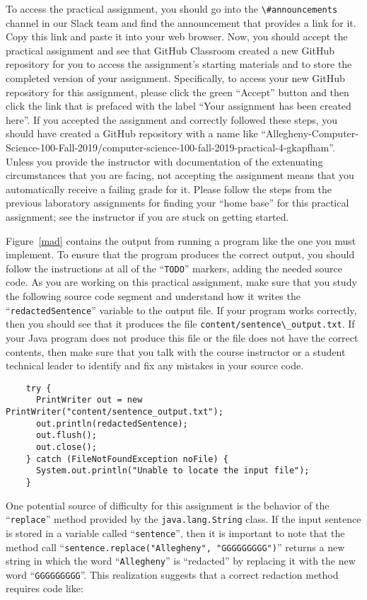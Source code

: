\documentclass[11pt]{article}
\newcommand{\command}[1]{``\lstinline{#1}''}
\newcommand{\program}[1]{\lstinline{#1}}
\newcommand{\channel}[1]{\lstinline{#1}}
\begin{document}
To access the practical assignment, you should go into the
\channel{\#announcements} channel in our Slack team and find the announcement
that provides a link for it. Copy this link and paste it into your web browser.
Now, you should accept the practical assignment and see that GitHub Classroom
created a new GitHub repository for you to access the assignment's starting
materials and to store the completed version of your assignment. Specifically,
to access your new GitHub repository for this assignment, please click the green
``Accept'' button and then click the link that is prefaced with the label ``Your
assignment has been created here''. If you accepted the assignment and correctly
followed these steps, you should have created a GitHub repository with a name
like
``Allegheny-Computer-Science-100-Fall-2019/computer-science-100-fall-2019-practical-4-gkapfham''.
Unless you provide the instructor with documentation of the extenuating
circumstances that you are facing, not accepting the assignment means that you
automatically receive a failing grade for it. Please follow the steps from the
previous laboratory assignments for finding your ``home base'' for this
practical assignment; see the instructor if you are stuck on getting started.

Figure~\ref{mad} contains the output from running a program like the one you
must implement. To ensure that the program produces the correct output, you
should follow the instructions at all of the \command{TODO} markers, adding the
needed source code. As you are working on this practical assignment, make sure
that you study the following source code segment and understand how it writes
the \command{redactedSentence} variable to the output file. If your program
works correctly, then you should see that it produces the file
\program{content/sentence\_output.txt}. If your Java program does not produce
this file or the file does not have the correct contents, then make sure that
you talk with the course instructor or a student technical leader to identify
and fix any mistakes in your source code.

\begin{verbatim}
    try {
      PrintWriter out = new PrintWriter("content/sentence_output.txt");
      out.println(redactedSentence);
      out.flush();
      out.close();
    } catch (FileNotFoundException noFile) {
      System.out.println("Unable to locate the input file");
    }
\end{verbatim}

One potential source of difficulty for this assignment is the behavior of the
\command{replace} method provided by the \program{java.lang.String} class. If
the input sentence is stored in a variable called \command{sentence}, then it is
important to note that the method call \command{sentence.replace("Allegheny",
"GGGGGGGGG")} returns a new string in which the word \command{Allegheny} is
``redacted'' by replacing it with the new word \command{GGGGGGGGG}. This
realization suggests that a correct redaction method requires code like:
\end{document}
